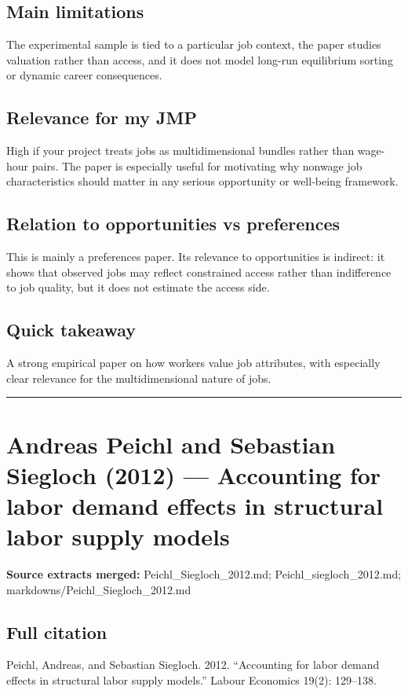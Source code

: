 \documentclass[11pt,a4paper]{article}
\begin{document}
\subsection*{Main limitations}
The experimental sample is tied to a particular job context, the paper studies valuation rather than access, and it does not model long-run equilibrium sorting or dynamic career consequences.

\subsection*{Relevance for my JMP}
High if your project treats jobs as multidimensional bundles rather than wage-hour pairs. The paper is especially useful for motivating why nonwage job characteristics should matter in any serious opportunity or well-being framework.

\subsection*{Relation to opportunities vs preferences}
This is mainly a preferences paper. Its relevance to opportunities is indirect: it shows that observed jobs may reflect constrained access rather than indifference to job quality, but it does not estimate the access side.

\subsection*{Quick takeaway}
A strong empirical paper on how workers value job attributes, with especially clear relevance for the multidimensional nature of jobs.


\medskip\hrule\medskip

\section*{Andreas Peichl and Sebastian Siegloch (2012) — Accounting for labor demand effects in structural labor supply models}

\textbf{Source extracts merged:} Peichl\_Siegloch\_2012.md; Peichl\_siegloch\_2012.md; markdowns/Peichl\_Siegloch\_2012.md

\subsection*{Full citation}
Peichl, Andreas, and Sebastian Siegloch. 2012. “Accounting for labor demand effects in structural labor supply models.” Labour Economics 19(2): 129–138.
\end{document}
